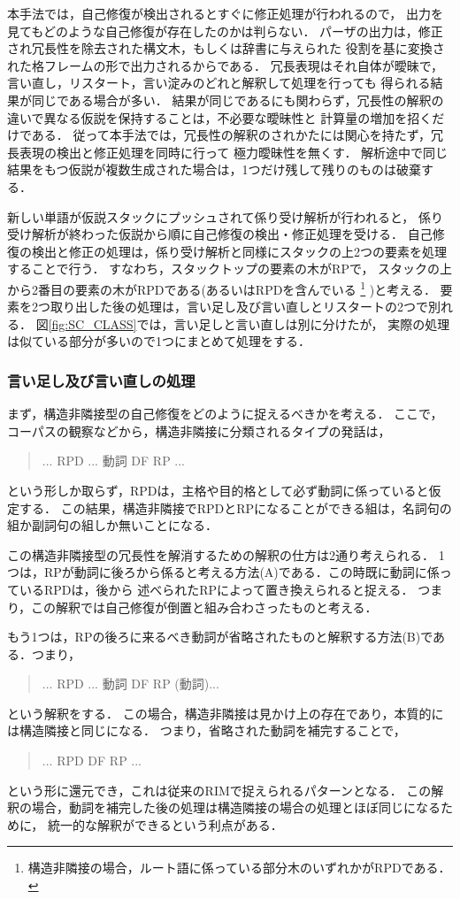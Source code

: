 本手法では，自己修復が検出されるとすぐに修正処理が行われるので，
出力を見てもどのような自己修復が存在したのかは判らない．
パーザの出力は，修正され冗長性を除去された構文木，もしくは辞書に与えられた
役割を基に変換された格フレームの形で出力されるからである．
冗長表現はそれ自体が曖昧で，言い直し，リスタート，言い淀みのどれと解釈して処理を行っても
得られる結果が同じである場合が多い．
結果が同じであるにも関わらず，冗長性の解釈の違いで異なる仮説を保持することは，不必要な曖昧性と
計算量の増加を招くだけである．
従って本手法では，冗長性の解釈のされかたには関心を持たず，冗長表現の検出と修正処理を同時に行って
極力曖昧性を無くす．
解析途中で同じ結果をもつ仮説が複数生成された場合は，1つだけ残して残りのものは破棄する．

新しい単語が仮説スタックにプッシュされて係り受け解析が行われると，
係り受け解析が終わった仮説から順に自己修復の検出・修正処理を受ける．
自己修復の検出と修正の処理は，係り受け解析と同様にスタックの上2つの要素を処理することで行う．
すなわち，スタックトップの要素の木がRPで，
スタックの上から2番目の要素の木がRPDである(あるいはRPDを含んでいる
\footnote{構造非隣接の場合，ルート語に係っている部分木のいずれかがRPDである．}
)と考える．
要素を2つ取り出した後の処理は，言い足し及び言い直しとリスタートの2つで別れる．
図\ref{fig:SC_CLASS}では，言い足しと言い直しは別に分けたが，
実際の処理は似ている部分が多いので1つにまとめて処理をする．

\subsubsection{言い足し及び言い直しの処理}\label{subsubsec:processingSC}
まず，構造非隣接型の自己修復をどのように捉えるべきかを考える．
ここで，コーパスの観察などから，構造非隣接に分類されるタイプの発話は，
\begin{quote}
... RPD ... 動詞 DF RP ...
\end{quote}
という形しか取らず，RPDは，主格や目的格として必ず動詞に係っていると仮定する．
この結果，構造非隣接でRPDとRPになることができる組は，名詞句の組か副詞句の組しか無いことになる．

この構造非隣接型の冗長性を解消するための解釈の仕方は2通り考えられる．
1つは，RPが動詞に後ろから係ると考える方法(A)である．この時既に動詞に係っているRPDは，後から
述べられたRPによって置き換えられると捉える．
つまり，この解釈では自己修復が倒置と組み合わさったものと考える．

もう1つは，RPの後ろに来るべき動詞が省略されたものと解釈する方法(B)である．つまり，
\begin{quote}
... RPD ... 動詞 DF RP (動詞)...
\end{quote}
という解釈をする．
この場合，構造非隣接は見かけ上の存在であり，本質的には構造隣接と同じになる．
つまり，省略された動詞を補完することで，
\begin{quote}
... RPD DF RP ...
\end{quote}
という形に還元でき，これは従来のRIMで捉えられるパターンとなる．
この解釈の場合，動詞を補完した後の処理は構造隣接の場合の処理とほぼ同じになるために，
統一的な解釈ができるという利点がある．

